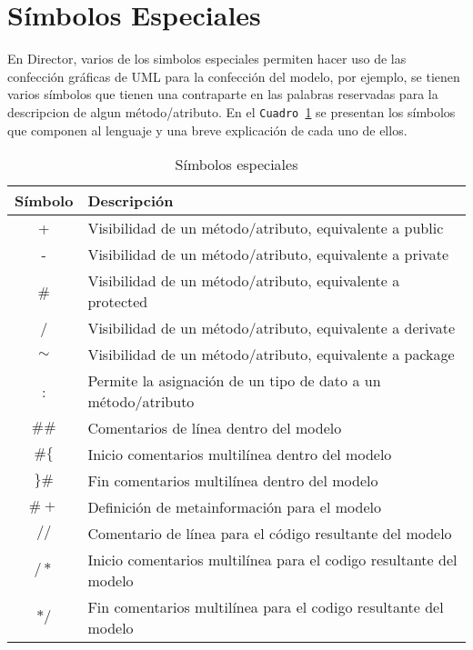 \section{Símbolos Especiales}
\label{sec:simbolosespeciales}

En Director, varios de los simbolos especiales permiten hacer uso de las
confección gráficas de UML para la confección del modelo, por ejemplo, se
tienen varios símbolos que tienen una contraparte en las palabras reservadas
para la descripcion de algun método/atributo. En el \texttt{Cuadro
\ref{c:s_especiales}} se presentan los símbolos que componen al lenguaje y una
breve explicación de cada uno de ellos.

\begin{table}[ht]
\centering
\caption{Símbolos especiales}
\begin{tabular}{c p{9cm} }
\hline
	Símbolo & Descripción \\ \hline
	+ & Visibilidad de un método/atributo, equivalente a public\\
	- & Visibilidad de un método/atributo, equivalente a private\\
  \# & Visibilidad de un método/atributo, equivalente a protected\\
	/ & Visibilidad de un método/atributo, equivalente a derivate\\
$\sim$ & Visibilidad de un método/atributo, equivalente a package\\
	: & Permite la asignación de un tipo de dato a un método/atributo\\
$\#\#$ & Comentarios de línea dentro del modelo \\
$\#\{$ & Inicio comentarios multilínea dentro del modelo\\
$\}\#$ & Fin comentarios multilínea dentro del modelo\\
$\# +$ & Definición de metainformación para el modelo\\
$//$ & Comentario de línea para el código resultante del modelo\\
$/*$ & Inicio comentarios multilínea para el codigo resultante del modelo\\
$*/$ & Fin comentarios multilínea para el codigo resultante del modelo\\ \hline
\end{tabular}
\label{c:s_especiales}
\end{table}

